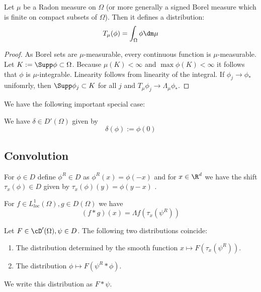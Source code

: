\begin{example}
	Let $\mu$ be a Radon measure on $\Omega$ (or more generally a signed Borel measure which is finite on compact subsets of $\Omega$). Then it defines a distribution:
	\[
	T_\mu(\phi) = \int_{\Omega} \phi \dm \mu
	\]
\end{example}
\begin{proof}
	As Borel sets are $\mu$-measurable, every continuous function is $\mu$-measurable. Let $K := \Supp \phi \subset \Omega $. Because $\mu(K) < \infty$ and $\max \phi(K) < \infty$ it follows that $\phi$ is $\mu$-integrable. Linearity follows from linearity of the integral. If $\phi_j \to \phi_*$ unifomrly, then $\Supp \phi_j  \subset K$ for all $j$ and $T_\mu \phi_j \to \Lambda_\mu \phi_*$.
\end{proof}
We have the following important special case:
\begin{example}
	We have $\delta \in D'(\Omega)$ given by
	\[
	\delta(\phi) := \phi(0)
	\]
\end{example}

\subsection{Convolution}
\begin{notation}
	For $\phi \in D$ define $\phi^R \in D$ as $\phi^R(x) = \phi(-x)$ and for $x \in \R^d$ we have the shift $\tau_x(\phi) \in D$ given by $\tau_x(\phi)(y) = \phi(y - x)$ .
\end{notation}
\begin{example}{\label{ex:conv}}
	For $f \in L^1_{loc}(\Omega), g \in D(\Omega)$ we have
	\[
	(f * g)(x) = \Lambda f (\tau_x (\psi^R))
	\]
\end{example}
\begin{proposition}

	Let $F \in \cD'(\Omega) , \psi \in D$. The following two distributions coincide:
	\begin{enumerate}
		\item The distribution determined by the smooth function $x \mapsto F(\tau_x (\psi^R))$.
		\item The distribution $\phi \mapsto F(\psi^R * \phi)$.
	\end{enumerate}
	We write this distribution as $F * \psi$.
\end{proposition}

